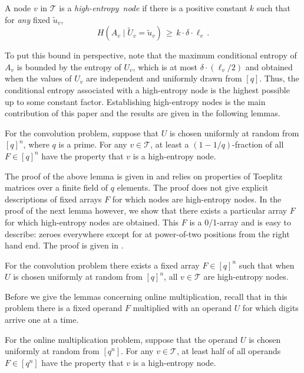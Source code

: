 \documentclass{toc}
\newcommand{\calT}{\ensuremath{\mathcal{T}}}
\newcommand{\Xv}{\ensuremath{U_v}}
\newcommand{\Xvknown}{\ensuremath{\widetilde{U}_v}}
\newcommand{\Xvfix}{\ensuremath{\widetilde{u}_v}}
\newcommand{\Yv}{\ensuremath{A_v}}
\begin{document}
\begin{definition}
	\label{def:high-node}A node $v$ in
	$\calT$ is a \emph{high-entropy~node} if there is a positive constant
	$k$ such that for \emph{any} fixed $\Xvfix$, 
	$$
	H(\Yv\mid\Xvknown=\Xvfix)\,\geq\, k\cdot\delta\cdot\ell_{v}\,.
	$$
\end{definition}

To put this bound in perspective, note that the maximum conditional
entropy of $\Yv$ is bounded by the entropy of $\Xv$, which is at
most $\delta\cdot(\ell_{v}/2)$ and obtained when the values of $\Xv$
are independent and uniformly drawn from $[q]$. Thus, the
conditional entropy associated with a high-entropy node is the highest
possible up to some constant factor.
Establishing high-entropy nodes is the main contribution of this paper and the results are given in the following lemmas.


\begin{lemma}
	\label{lem:conv-rand-H-lower}
	For the convolution problem,
	suppose that $U$ is chosen uniformly at random from $[q]^n$, where $q$ is a prime. For any $v \in \calT$, at least a $(1-{1}/{q})$-fraction of all $F \in [q]^n$ have the property that $v$ is a high-entropy node.
\end{lemma}

The proof of the above lemma is given in  and relies on properties of Toeplitz matrices over a finite field of $q$ elements. The proof does not give explicit descriptions of fixed arrays $F$ for which nodes are high-entropy nodes. 
In the proof of the next lemma however, we show that there exists a particular array $F$ for which high-entropy nodes are obtained. This $F$ is a 0/1-array and is easy to describe: zeroes everywhere except for at power-of-two positions from the right hand end. The proof is given in .

\begin{lemma}
	\label{lem:conv-H-lower}
	For the convolution problem there exists a fixed array $F\in [q]^n$ such that when $U$ is chosen uniformly at random from $[q]^n$, all $v \in \calT$ are high-entropy nodes.
\end{lemma}

Before we give the lemmas concerning online multiplication, recall that in this problem there is a fixed operand $F$ multiplied with an operand $U$ for which digits arrive one at a time.

\begin{lemma}
	\label{lem:mult-rand-H-lower}
	For the online multiplication problem, suppose that the operand $U$ is chosen uniformly at random from $[q^n]$. For any $v \in \calT$, at least half of all operands $F\in [q^n]$ have the property that $v$ is a high-entropy node.
\end{lemma}
\end{document}
